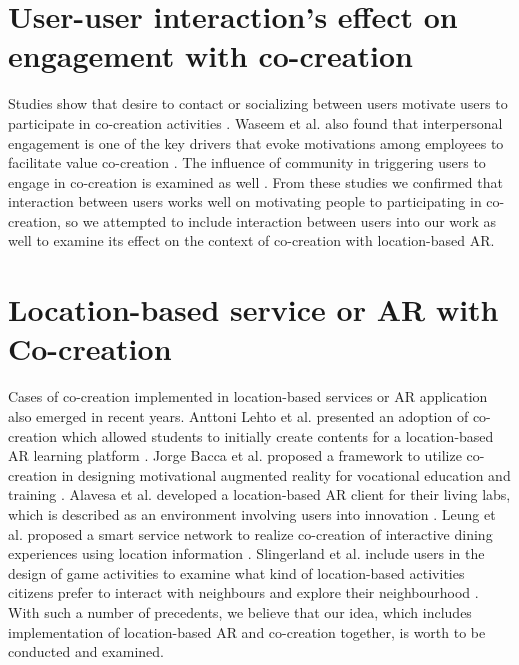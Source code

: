 \section{User-user interaction's effect on engagement with co-creation}
Studies show that desire to contact or socializing between users motivate users to participate in co-creation activities \cite{fernandes_remelhe_2016}\cite{engstrom_elg_2015}.
Waseem et al. also found that interpersonal engagement is one of the key drivers that evoke motivations among employees to facilitate value co-creation \cite{waseem_biggemann_garry_2020}.
The influence of community in triggering users to engage in co-creation is examined as well \cite{palma_trimi_hong_2018}\cite{zhang_kandampully_bilgihan_2015}.
From these studies we confirmed that interaction between users works well on motivating people to participating in co-creation,
so we attempted to include interaction between users into our work as well to examine its effect on the context of co-creation with location-based AR.

\section{Location-based service or AR with Co-creation}
Cases of co-creation implemented in location-based services or AR application also emerged in recent years.
Anttoni Lehto et al. presented an adoption of co-creation which allowed students to initially create contents for a location-based AR learning platform \cite{lehto_lautkankare_brander_alanissila_saari_salminen_2020}.
Jorge Bacca et al. proposed a framework to utilize co-creation in designing motivational augmented reality for vocational education and training \cite{acosta_navarro_gesa_kinshuk_2019}.
Alavesa et al. developed a location-based AR client for their living labs, which is described as an environment involving users into innovation \cite{alavesa_2018}.
Leung et al. proposed a smart service network to realize co-creation of interactive dining experiences using location information \cite{leung_loo_2020}.
Slingerland et al. include users in the design of game activities to examine what kind of location-based activities citizens prefer to interact with neighbours and explore their neighbourhood \cite{slingerland_fonseca_lukosch_brazier_2020}.
With such a number of precedents, we believe that our idea, which includes implementation of location-based AR and co-creation together, is worth to be conducted and examined.
